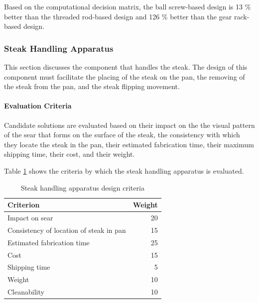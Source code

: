 \documentclass[11pt]{article}
\newcommand{\subsubsubsection}[1]{\paragraph{#1}\mbox{}}
\begin{document}
Based on the computational decision matrix, the ball screw-based design is 13 \% better than the threaded rod-based design and 126 \% better than the gear rack-based design.

\subsubsection{Steak Handling Apparatus}

This section discusses the component that handles the steak.
The design of this component must facilitate the placing of the steak on the pan, the removing of the steak from the pan, and the steak flipping movement.

\subsubsubsection{Evaluation Criteria}

\noindent
Candidate solutions are evaluated based on their impact on the the visual pattern of the sear that forms on the surface of the steak, the consistency with which they locate the steak in the pan, their estimated fabrication time, their maximum shipping time, their cost, and their weight.

Table \ref{table:steak handling apparatus criteria} shows the criteria by which the steak handling apparatus is evaluated.

\begin{table}[H]
\begin{tabularx}{\textwidth}{X  r}

\hline

Criterion & Weight \\

\hline

Impact on sear & 20 \\
Consistency of location of steak in pan & 15 \\
Estimated fabrication time & 25 \\
Cost & 15 \\
Shipping time & 5 \\
Weight & 10 \\
Cleanability & 10 \\

\hline

\end{tabularx}
\caption{Steak handling apparatus design criteria}
\label{table:steak handling apparatus criteria}
\end{table}
\end{document}
